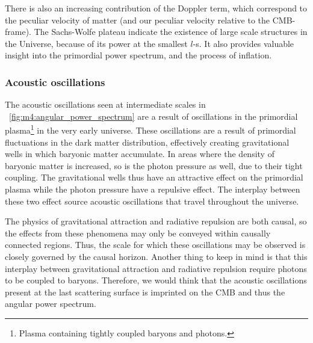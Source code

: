         There is also an increasing contribution of the Doppler term, which correspond to the peculiar velocity of matter (and our peculiar velocity relative to the CMB-frame). The Sachs-Wolfe plateau indicate the existence of large scale structures in the Universe, because of its power at the smallest $l$-s. It also provides valuable insight into the primordial power spectrum, and the process of inflation. 

    \subsubsection{Acoustic oscillations}
        The acoustic oscillations seen at intermediate scales in ~\cref{fig:m4:angular_power_spectrum} are a result of oscillations in the primordial plasma\footnote{Plasma containing tightly coupled baryons and photons.} in the very early universe. These oscillations are a result of primordial fluctuations in the dark matter distribution, effectively creating gravitational wells in which baryonic matter accumulate. In areas where the density of baryonic matter is increased, so is the photon pressure as well, due to their tight coupling. The gravitational wells thus have an attractive effect on the primordial plasma while the photon pressure have a repulsive effect. The interplay between these two effect source acoustic oscillations that travel throughout the universe. 

        The physics of gravitational attraction and radiative repulsion are both causal, so the effects from these phenomena may only be conveyed within causally connected regions. Thus, the scale for which these oscillations may be observed is closely governed by the causal horizon. Another thing to keep in mind is that this interplay between gravitational attraction and radiative repulsion require photons to be coupled to baryons. Therefore, we would think that the acoustic oscillations present at the last scattering surface is imprinted on the CMB and thus the angular power spectrum.

